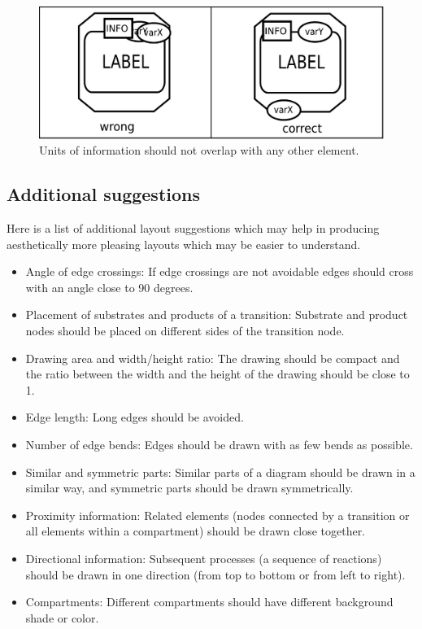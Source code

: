 \begin{figure}[h!]
  \centering
  \includegraphics[scale=0.5]{images/layout-unit-information}
  \caption{Units of information should not overlap with any
  other element.}\label{fig:af:layout7}
\end{figure}

\subsection{Additional suggestions}

Here is a list of additional layout suggestions which may help in
producing aesthetically more pleasing layouts which may be easier to
understand.

\begin{itemize}
  \item Angle of edge crossings: If edge crossings are not avoidable
  edges should cross with an angle close to 90 degrees.
  \item Placement of substrates and products of a transition:
  Substrate and product nodes should be placed
  on different sides of the transition node.
  \item Drawing area and width/height ratio: The drawing should
  be compact and the ratio between the width and the height
  of the drawing should be close to 1.
  \item Edge length: Long edges should be avoided.
  \item Number of edge bends: Edges should be drawn with
  as few bends as possible.
  \item Similar and symmetric parts: Similar parts of a diagram
  should be drawn in a similar way, and symmetric parts
  should be drawn symmetrically.
  \item Proximity information: Related elements (\eg nodes
  connected by a transition or all elements within a compartment)
  should be drawn close together.
  \item Directional information: Subsequent processes (\eg a sequence
  of reactions) should be drawn in one direction (\eg from
  top to bottom or from left to right).
  \item Compartments: Different compartments should have different
  background shade or color.
\end{itemize}
